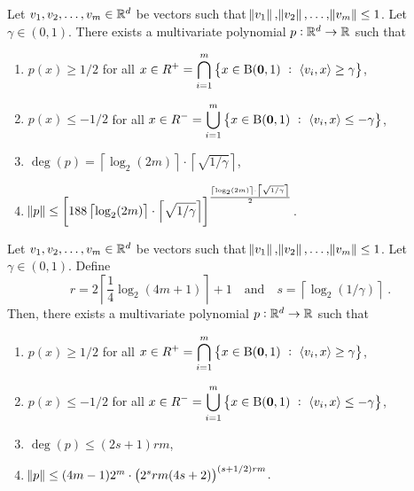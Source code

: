\begin{theorem}
\label{theorem:polynomial-approximation-1}
Let $v_1, v_2, \dots, v_m \in \mathbb{R}^d$ be vectors such that $\norm{v_1},
\norm{v_2}, \dots, \norm{v_m} \le 1$. Let $\gamma \in (0,1)$. There exists a
multivariate polynomial $p:\mathbb{R}^d \to \mathbb{R}$ such that
\begin{enumerate}
\item $p(x) \ge 1/2$ for all $\displaystyle x \in R^+ = \bigcap_{i=1}^m \left\{ x \in \operatorname{B}(\mathbf{0},1) ~:~  \left\langle v_i, x \right\rangle \ge \gamma \right\}$,
\item $p(x) \le -1/2$ for all $\displaystyle x \in R^- = \bigcup_{i=1}^m \left\{ x \in \operatorname{B}(\mathbf{0},1) ~:~  \left\langle v_i, x \right\rangle \le - \gamma \right\}$,
\item $\displaystyle \deg(p) = \left\lceil \log_2(2m) \right\rceil \cdot \left\lceil \sqrt{{1}/{\gamma}} \right\rceil$,
\item $\displaystyle \norm{p} \le \left[ 188 \left\lceil \log_2(2m) \right\rceil \cdot \left\lceil \sqrt{{1}/{\gamma}} \right\rceil \right]^{
  \frac{
    \left\lceil \log_2(2m) \right\rceil \cdot \left\lceil \sqrt{{1}/{\gamma}} \right\rceil
  }{2}
}$.
\end{enumerate}
\end{theorem}

\begin{theorem}
\label{theorem:polynomial-approximation-2}
Let $v_1, v_2, \dots, v_m \in \mathbb{R}^d$ be vectors such that $\norm{v_1},
\norm{v_2}, \dots, \norm{v_m} \le 1$. Let $\gamma \in (0,1)$.
Define
$$
r = 2 \left\lceil \frac{1}{4} \log_2(4m + 1) \right\rceil + 1 \quad \text{and} \quad s = \left \lceil \log_2(1/\gamma) \right \rceil \; .
$$
Then, there exists a multivariate polynomial $p:\mathbb{R}^d \to \mathbb{R}$ such that
\begin{enumerate}
\item $\displaystyle p(x) \ge 1/2$
for all $\displaystyle x \in R^+ = \bigcap_{i=1}^m \left\{ x \in \operatorname{B}(\mathbf{0},1) ~:~ \left\langle v_i, x \right\rangle \ge \gamma \right\}$,

\item $\displaystyle p(x) \le - 1/2$
for all $\displaystyle x \in R^- = \bigcup_{i=1}^m \left\{ x \in \operatorname{B}(\mathbf{0},1) ~:~ \left\langle v_i, x \right\rangle \le - \gamma \right\}$,

\item $\deg(p) \le (2s+1) rm$,
\item $\norm{p} \le (4m-1) 2^m \cdot \left(2^s rm (4s+2) \right)^{(s+1/2)rm}$.
\end{enumerate}
\end{theorem}

